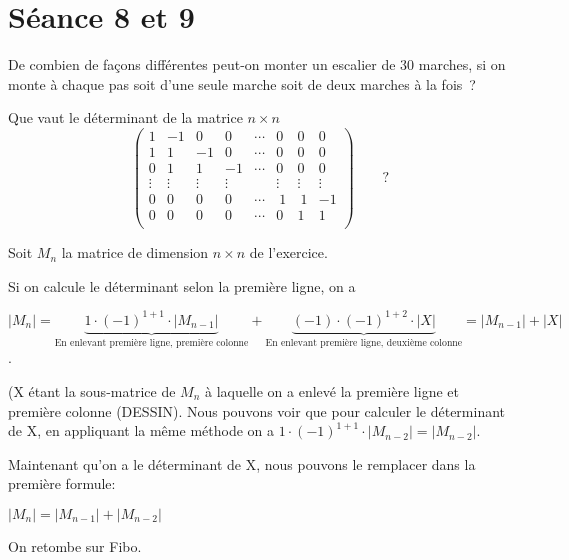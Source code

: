 \section{Séance 8 et 9}

\begin{exo}
De combien de fa\c{c}ons diff\'erentes peut-on monter un escalier de 30 marches, si on monte \`a chaque pas soit d'une seule marche soit de deux marches \`a la fois~?
\end{exo}


\begin{exo} 
Que vaut le d\'eterminant de la matrice $n \times n$ 
$$
\left( 
\begin{array}{rrrrrrrr}
1 &-1 &0  &0  &\cdots &0 &0 &0\\
1 & 1 &-1 &0  &\cdots &0 &0 &0\\
0 & 1 &1  &-1 &\cdots &0 &0 &0\\
\vdots & \vdots & \vdots & \vdots && \vdots & \vdots &\vdots\\
0 & 0 & 0 & 0 & \cdots & ~1 &~1 &-1\\
0 & 0 & 0 & 0 & \cdots & 0 &1 &1\\
\end{array}
\right) \qquad ?
$$
\end{exo}

Soit $M_n$ la matrice de dimension $n\times n$ de l'exercice.

Si on calcule le déterminant selon la première ligne, on a 

$$|M_n| = \underbrace{1\cdot (-1)^{1+1} \cdot |M_{n-1}|}_{\text{En enlevant première ligne, première colonne}} + \underbrace{(-1) \cdot (-1)^{1+2} \cdot |X|}_{\text{En enlevant première ligne, deuxième colonne}} = |M_{n-1}| + |X|$$. 

(X étant la sous-matrice de $M_n$ à laquelle on a enlevé la première ligne et première colonne (DESSIN). Nous pouvons voir que pour calculer le déterminant de X, en appliquant la même méthode on a $1 \cdot (-1)^{1+1} \cdot |M_{n-2}| = |M_{n-2}|$.

Maintenant qu'on a le déterminant de X, nous pouvons le remplacer dans la première formule:

$|M_{n}| = |M_{n-1}| + |M_{n-2}|$

On retombe sur Fibo.


